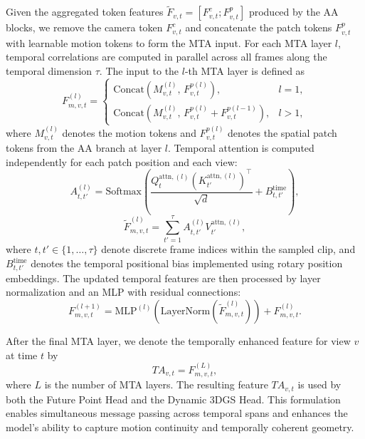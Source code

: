 Given the aggregated token features $\tilde{F}_{v,t} = [F_{v,t}^{c}; F_{v,t}^{p}]$ produced by the AA blocks, we remove the camera token $F_{v,t}^{c}$ and concatenate the patch tokens $F_{v,t}^{p}$ with learnable motion tokens to form the MTA input. 
For each MTA layer $l$, temporal correlations are computed in parallel across all frames along the temporal dimension $\tau$. 
The input to the $l$-th MTA layer is defined as
\begin{equation}
F_{m,v,t}^{(l)} = 
\begin{cases}
\mathrm{Concat}\!\left(M_{v,t}^{(l)},\, F_{v,t}^{p(l)}\right), & l = 1,\\
\mathrm{Concat}\!\left(M_{v,t}^{(l)},\, F_{v,t}^{p(l)} + F_{v,t}^{p(l-1)}\right), & l > 1,
\end{cases}
\end{equation}
where $M_{v,t}^{(l)}$ denotes the motion tokens and $F_{v,t}^{p(l)}$ denotes the spatial patch tokens from the AA branch at layer $l$.
Temporal attention is computed independently for each patch position and each view:
\begin{equation}
A_{t,t'}^{(l)} = 
\mathrm{Softmax}\!\left(
\frac{Q_{t}^{\mathrm{attn},(l)} \left(K_{t'}^{\mathrm{attn},(l)}\right)^\top}{\sqrt{d}}
+ B_{t,t'}^{\mathrm{time}}
\right),
\end{equation}
\begin{equation}
\tilde{F}_{m,v,t}^{(l)} = \sum_{t'=1}^{\tau} A_{t,t'}^{(l)} V_{t'}^{\mathrm{attn},(l)},
\end{equation}
where $t,t' \in \{1,\dots,\tau\}$ denote discrete frame indices within the sampled clip, and $B_{t,t'}^{\mathrm{time}}$ denotes the temporal positional bias implemented using rotary position embeddings.
The updated temporal features are then processed by layer normalization and an MLP with residual connections:
\begin{equation}
F_{m,v,t}^{(l+1)} = \mathrm{MLP}^{(l)}\!\left(\mathrm{LayerNorm}\!\left(\tilde{F}_{m,v,t}^{(l)}\right)\right) + F_{m,v,t}^{(l)}.
\end{equation}

After the final MTA layer, we denote the temporally enhanced feature for view $v$ at time $t$ by
\begin{equation}
TA_{v,t} = F_{m,v,t}^{(L)},
\end{equation}
where $L$ is the number of MTA layers. 
The resulting feature $TA_{v,t}$ is used by both the Future Point Head and the Dynamic 3DGS Head.
This formulation enables simultaneous message passing across temporal spans and enhances the model’s ability to capture motion continuity and temporally coherent geometry.

